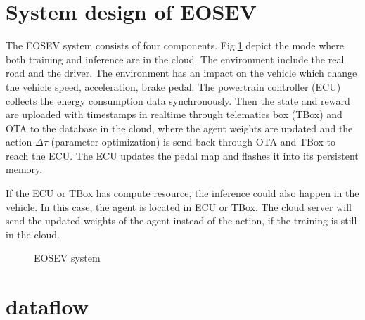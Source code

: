 \documentclass{article}
\begin{document}
\begin{appendices}

	\section{System design of EOSEV}\label{sec:system design}

	The EOSEV system consists of four components. Fig.\@\ref{fig:EOSEV system} depict the mode where both training and inference are in the cloud. The environment include the real road and the driver. The environment has an impact on the vehicle which change the vehicle speed, acceleration, brake pedal. The powertrain controller (ECU) collects the energy consumption data synchronously. Then the state and reward are uploaded with timestamps in realtime through telematics box (TBox) and OTA to the database in the cloud, where the agent weights are updated and the action $\Delta\tau$ (parameter optimization) is send back through OTA and TBox to reach the ECU. The ECU updates the pedal map and flashes it into its persistent memory.

	If the ECU or TBox has compute resource, the inference could also happen in the vehicle. In this case, the agent is located in ECU or TBox. The cloud server will send the updated weights of the agent instead of the action, if the training is still in the cloud.

	\begin{figure}[ht]
		\centering
		\def\svgwidth{0.8\columnwidth}
		
		\caption{\label{fig:veos} EOSEV system}\label{fig:EOSEV system}
	\end{figure}

	\section{dataflow}\label{sec:dataflow}


\end{appendices}
\end{document}

